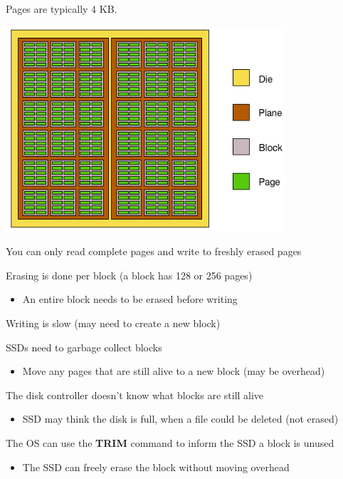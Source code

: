 \begin{slide}
  

    Pages are typically 4 KB.

    \includegraphics[height=0.65\textheight]{ssd.png} 

\end{slide}


\begin{slide}
  

    You can only read complete pages and write to freshly erased pages
    \bigskip

    Erasing is done per block (a block has 128 or 256 pages)
    \begin{itemize}
        \item An entire block needs to be erased before writing
    \end{itemize}
    \bigskip

    Writing is slow (may need to create a new block)

\end{slide}

\begin{slide}
  

    SSDs need to garbage collect blocks
    \begin{itemize}
        \item Move any pages that are still alive to a new block (may be overhead)
    \end{itemize}
    \bigskip

    The disk controller doesn't know what blocks are still alive
    \begin{itemize}
        \item SSD may think the disk is full, when a file could be deleted (not erased)
    \end{itemize}
    \bigskip

    The OS can use the \textbf{TRIM} command to inform the SSD a block is unused
    \begin{itemize}
        \item The SSD can freely erase the block without moving overhead
    \end{itemize}

\end{slide}

